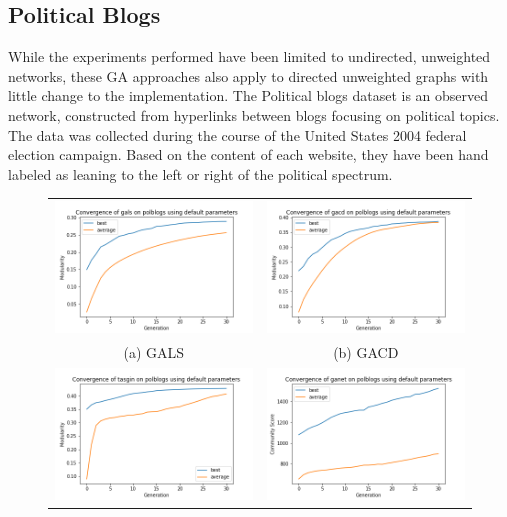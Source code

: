 \subsection{Political Blogs}
While the experiments performed have been limited to undirected, unweighted networks, these GA approaches also apply to directed unweighted graphs with little change to the implementation. The Political blogs dataset\cite{Adamic2005} is an observed network, constructed from hyperlinks between blogs focusing on political topics. The data was collected during the course of the United States 2004 federal election campaign. Based on the content of each website, they have been hand labeled as leaning to the left or right of the political spectrum.
\begin{figure}
	\begin{tabular}{cc}
		\includegraphics[width=65mm]{images/gals_default_polblogs.png} &   \includegraphics[width=65mm]{images/gacd_default_polblogs.png} \\
		(a) GALS & (b) GACD \\[6pt]
		\includegraphics[width=65mm]{images/tasgin_default_polblogs.png}  &
		\includegraphics[width=65mm]{images/ganet_default_polblogs.png} \\

\end{tabular}
\end{figure}
